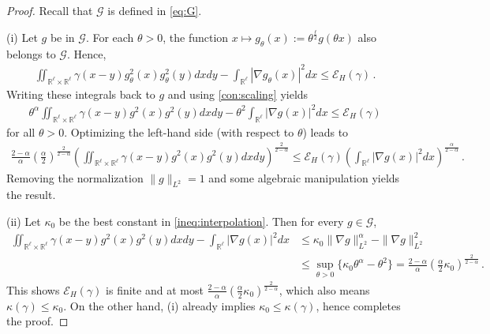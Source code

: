 \documentclass[12pt,reqno]{amsart}
\newtheorem{corollary}[theorem]{Corollary}
\theoremstyle{remark}
\newcommand{\1}{\mathbf{1}}
\def\RR{\mathbb{R}}
\def\cee{{\mathcal E}}
\def\cgg{{\mathcal G}}
\def\lt{\left}
\def\rt{\right}
\begin{document}
		\begin{proof}
		Recall that $\cgg$ is defined in \eqref{eq:G}. 
			
			(i) Let $g$ be in $\cgg$. For each $\theta>0$, the function $x\mapsto g_ \theta(x):=\theta^{\frac\ell2}{g(\theta x)}$ also belongs to $\cgg$. Hence,
			\begin{align*}
				\iint_{\RR^\ell\times\RR^\ell}\gamma(x-y)g_ \theta^2(x)g_ \theta^2(y)dxdy-\int_{\RR^\ell}|\nabla g_ \theta(x)|^2 dx\le \cee_H(\gamma)\,.
			\end{align*}
			Writing these integrals back to $g$ and using \ref{con:scaling} yields
			\begin{align*}
				\theta^ \alpha\iint_{\RR^\ell\times\RR^\ell}\gamma(x-y)g^2(x)g^2(y)dxdy- \theta^2\int_{\RR^\ell}|\nabla g(x)|^2 dx\le \cee_H(\gamma)
			\end{align*}
			for all $\theta>0$. Optimizing the left-hand side (with respect to $\theta$) leads to
			\begin{align*}
				\frac{2- \alpha}{\alpha}\lt(\frac\alpha2\rt)^{\frac2{2- \alpha}}\lt(\iint_{\RR^\ell\times\RR^\ell}\gamma(x-y)g^2(x)g^2(y)dxdy \rt)^{\frac2{2- \alpha}}\le \cee_H(\gamma)\lt(\int_{\RR^\ell}|\nabla g(x)|^2 dx\rt)^{\frac \alpha{2- \alpha}}\,.
			\end{align*}
			Removing the normalization $\|g\|_{L^2}=1$ and some algebraic manipulation yields the result.

			\noindent (ii) Let $\kappa_0$ be the best constant in \eqref{ineq:interpolation}. Then for every $g\in\cgg$, 
			\begin{align*}
				\iint_{\RR^\ell\times\RR^\ell}\gamma(x-y)g^2(x)g^2(y)dxdy-\int_{\RR^\ell}|\nabla g(x)|^2 dx
				&\le \kappa_0 \|\nabla g\|^{\alpha}_{L^2}-\|\nabla g\|^{2}_{L^2}
				\\&\le \sup_{\theta>0}\{\kappa_0 \theta^ \alpha- \theta^2 \}=\frac{2- \alpha}{\alpha}( \frac\alpha2 \kappa_0)^{\frac 2{2- \alpha}}\,.
			\end{align*}
			This shows $\cee_H(\gamma)$ is finite and at most $\frac{2- \alpha}{\alpha}( \frac\alpha2 \kappa_0)^{\frac 2{2- \alpha}}$, which also means $\kappa(\gamma)\le \kappa_0$. On the other hand, (i) already implies $\kappa_0\le \kappa(\gamma)$, hence completes the proof. 
		\end{proof}
\end{document}

